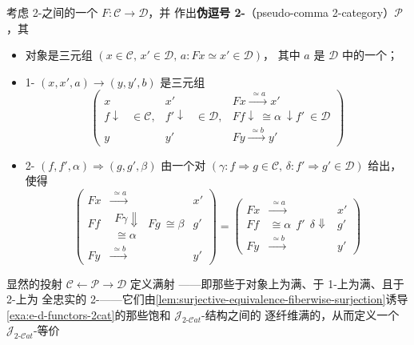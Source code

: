 \begin{example}\label{exa:pseudo-comma-2-category}
考虑 2-\trCategory{}之间的一个\trBiequivalence{} $F\colon\mathcal{C}\to\mathcal{D}$，并
作出\textbf{伪逗号 2-\trCategory}（pseudo-comma 2-category）$\mathcal{P}$，其
\begin{itemize}
\item 对象是三元组 $(x\in\mathcal{C},\,x'\in\mathcal{D},\,a:Fx\simeq x'\in\mathcal{D})$，
  其中 $a$ 是 $\mathcal{D}$ 中的一个\trEquivalence；
\item 1-\trCell{} $(x,x',a)\to(y,y',b)$ 是三元组
\begin{equation*}
\left(
\begin{array}{ccccc}
x & & x' & & Fx\xrightarrow{\ \simeq a\ }x'\\
f\downarrow & \in\mathcal{C}, & f'\downarrow & \in\mathcal{D}, &
Ff\downarrow\ \cong\alpha\ \downarrow f'\ \in\mathcal{D}\\
y & & y' & & Fy\xrightarrow{\ \simeq b\ }y'
\end{array}
\right)
\end{equation*}
\item 2-\trCell{} $(f,f',\alpha)\Rightarrow(g,g',\beta)$ 由一个对
  $(\gamma:f\Rightarrow g\in\mathcal{C},\,\delta:f'\Rightarrow g'\in\mathcal{D})$ 给出，
  使得
\begin{equation*}
\left(
\begin{array}{ccc}
Fx & \xrightarrow{\ \simeq a\ } & x'\\
Ff & \begin{matrix}F\gamma\Downarrow\\ \cong\alpha\end{matrix}\ Fg\ \cong\beta & g'\\
Fy & \xrightarrow{\ \simeq b\ } & y'
\end{array}
\right)
=
\left(
\begin{array}{ccc}
Fx & \xrightarrow{\ \simeq a\ } & x'\\
Ff & \cong\alpha\ \ f'\ \ \delta\Downarrow & g'\\
Fy & \xrightarrow{\ \simeq b\ } & y'
\end{array}
\right)
\end{equation*}
\end{itemize}
显然的投射 $\mathcal{C}\leftarrow\mathcal{P}\to\mathcal{D}$ 定义满射%
\trBiequivalence——即那些于对象上为满、于 1-\trCell{}上为满、且于 2-\trCell{}上为
全忠实的 2-\trFunctor——它们由\cref{lem:surjective-equivalence-fiberwise-surjection}诱导%
\cref{exa:e-d-functors-2cat}的那些饱和 $\mathcal{J}_{2\text{-}\mathcal{C}at}$-结构之间的
逐纤维满的\trNaturalTransformation，从而定义一个 $\mathcal{J}_{2\text{-}\mathcal{C}at}$-等价
\begin{center}
\end{center}
\end{example}

